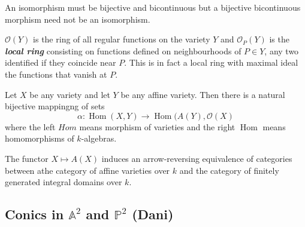 \begin{remark}
	An isomorphism must be bijective and bicontinuous but a bijective bicontinuous morphism need not be an isomorphism.
\end{remark}

\begin{defn}
	$\mathcal{O}(Y)$ is the ring of all regular functions on the variety $Y$ and $\mathcal{O}_P(Y)$ is the \textit{\textbf{local ring}} consisting on functions defined on neighbourhoods of $P\in Y$, any two identified if they coincide near $P$. This is in fact a local ring with maximal ideal the functions that vanish at $P$.
\end{defn}

\begin{prop}[3.5]\leavevmode
	Let $X$ be any variety and let $Y$ be any affine variety. Then there is a natural bijective mappingng of sets
	\[\alpha:\operatorname{Hom}(X,Y)\to \operatorname{Hom}(A(Y),\mathcal{O}(X) \]
	where the left $Hom$ means morphism of varieties and the right  $ \operatorname{Hom}$ means homomorphisms of $k$-algebras.
\end{prop}

	\begin{coro}[3.8]
		The functor $X\mapsto A(X)$ induces an arrow-reversing equivalence of categories between athe category of affine varieties over $k$ and the category of finitely generated integral domains over  $k$.
	\end{coro}

\subsection{Conics in $\mathbb{A}^2$ and $\mathbb{P}^2$ (Dani)}

